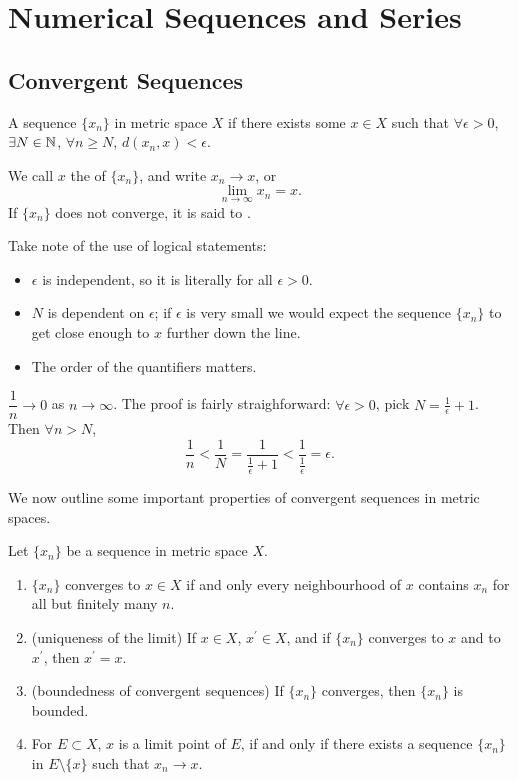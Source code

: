 \chapter{Numerical Sequences and Series}
\section{Convergent Sequences}
\begin{definition}
A sequence $\{x_n\}$ in metric space $X$  if there exists some $x\in X$ such that $\forall\epsilon>0$, $\exists N\in\mathbb N$, $\forall n\ge N$, $d(x_n,x)<\epsilon$.

We call $x$ the  of $\{x_n\}$, and write $x_n\to x$, or
\[\lim_{n\to\infty}x_n=x.\]
If $\{x_n\}$ does not converge, it is said to .
\end{definition}

\begin{remark}
Take note of the use of logical statements:
\begin{itemize}
\item $\epsilon$ is independent, so it is literally for all $\epsilon>0$.
\item $N$ is dependent on $\epsilon$; if $\epsilon$ is very small we would expect the sequence $\{x_n\}$ to get close enough to $x$ further down the line.
\item The order of the quantifiers matters.
\end{itemize}
\end{remark}

\begin{example}
$\dfrac{1}{n}\to 0$ as $n\to\infty$. The proof is fairly straighforward: $\forall\epsilon>0$, pick $N=\frac{1}{\epsilon}+1$. Then $\forall n>N$,
\[ \frac{1}{n}<\frac{1}{N}=\frac{1}{\frac{1}{\epsilon}+1}<\frac{1}{\frac{1}{\epsilon}}=\epsilon. \]
\end{example}

We now outline some important properties of convergent sequences in metric spaces.

\begin{proposition}
Let $\{x_n\}$ be a sequence in metric space $X$.
\begin{enumerate}[label=(\arabic*)]
\item $\{x_n\}$ converges to $x\in X$ if and only every neighbourhood of $x$ contains $x_n$ for all but finitely many $n$.
\item (uniqueness of the limit) If $x\in X$, $x^\prime\in X$, and if $\{x_n\}$ converges to $x$ and to $x^\prime$, then $x^\prime=x$.
\item (boundedness of convergent sequences) If $\{x_n\}$ converges, then $\{x_n\}$ is bounded.
\item For $E\subset X$, $x$ is a limit point of $E$, if and only if there exists a sequence $\{x_n\}$ in $E\setminus\{x\}$ such that $x_n\to x$.
\end{enumerate}
\end{proposition}

